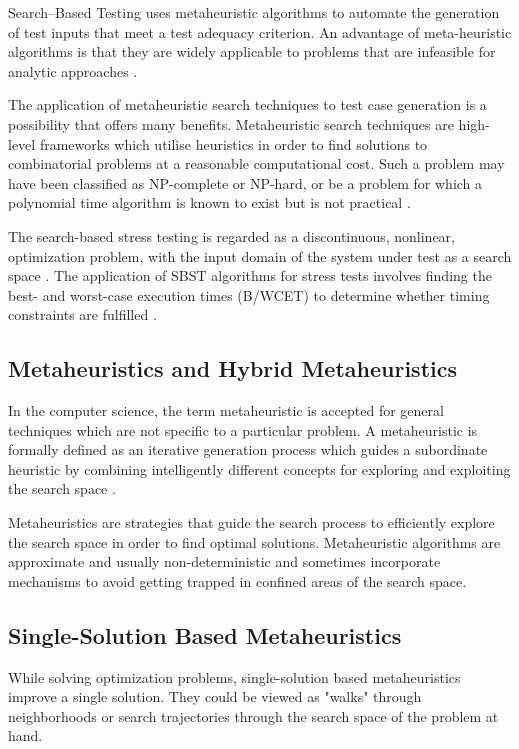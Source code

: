 Search–Based Testing uses metaheuristic algorithms to
automate the generation of test inputs that meet a test
adequacy criterion. An advantage of meta-heuristic algorithms is that they are widely applicable to problems that are infeasible for analytic approaches \citep{Baars2011} \citep{Alba2008}. 

The application of metaheuristic search techniques to test case generation is  a possibility that offers many benefits. Metaheuristic search techniques are high-level frameworks which utilise heuristics in order to find solutions to combinatorial problems at a reasonable computational cost. Such a problem may have been classified as NP-complete or NP-hard, or be a problem for which a polynomial time algorithm is known to exist but is not practical \citep{McMinn2004}.

The search-based stress testing is regarded as a discontinuous, nonlinear, optimization problem, with the input domain of the system under test as a search space \citep{Sullivan}.  The application of SBST algorithms for stress tests involves finding the best- and worst-case execution times (B/WCET) to determine whether timing constraints are fulfilled \citep{Afzal2009a}. 

\subsection{Metaheuristics and Hybrid Metaheuristics}

In the computer science, the term metaheuristic is accepted for general techniques which are not specific to a particular problem. A metaheuristic is formally defined as an iterative generation process which guides a subordinate heuristic by combining intelligently different concepts for exploring and exploiting the search space \citep{raidl2010metaheuristic}. 

Metaheuristics are strategies that guide the search process to efficiently explore the search space in order to find optimal solutions. Metaheuristic algorithms are approximate and usually non-deterministic and sometimes incorporate mechanisms to avoid getting trapped in confined areas of the search space. 

\subsection{Single-Solution Based Metaheuristics}

While solving optimization problems, single-solution based metaheuristics improve a single solution. They could be viewed as "walks" through neighborhoods or search trajectories through the search space of the problem at hand.
 

